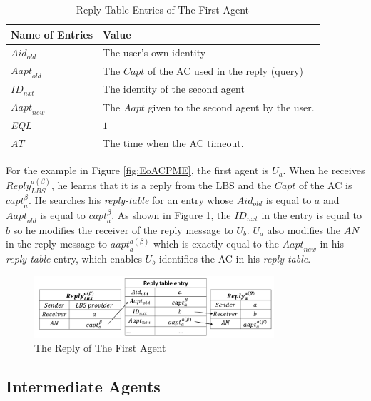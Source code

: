 \documentclass[conference]{IEEEtran}
\begin{document}
\begin{table} [hbtp]
\caption{Reply Table Entries of The First Agent}
\label{table:RTEFirstAgt}
\centering
\tabulinesep=1mm
\begin{tabu} to 80 mm {|X[1,c]|X[3,l]|} \hline 
Name of Entries & Value \\ \hline 
${Aid}_{old}$ & The user's own identity \\ \hline 
${Aapt}_{old}$ & The $Capt$ of the AC used in the reply (query) \\ \hline 
${ID}_{nxt}$ & The identity of the second agent \\ \hline 
${Aapt}_{new}$ & The $Aapt$ given to the second agent by the user. \\ \hline 
\textit{EQL} & $1$ \\ \hline 
$AT$ & The time when the AC timeout. \\ \hline 
\end{tabu}
\end{table}

For the example in Figure \ref{fig:EoACPME}, the first agent is $U_a$. When he receives ${Reply}^{a\left(\beta\right)}_{LBS}$, he learns that it is a reply from the LBS and the $Capt$ of the AC is ${capt}^{\beta}_a$. He searches his \textit{reply-table} for an entry whose ${Aid}_{old}$ is equal to $a$ and ${Aapt}_{old}$ is equal to ${capt}^{\beta }_a$. As shown in Figure \ref{fig:ReplyOfFirstAgent}, the ${ID}_{nxt}$ in the entry is equal to $b$ so he modifies the receiver of the reply message to $U_b$. $U_a$ also modifies the $AN$ in the reply message to ${aapt}^{a\left(\beta\right)}_a$ which is exactly equal to the ${Aapt}_{new}$ in his \textit{reply-table} entry, which enables $U_b$ identifies the AC in his \textit{reply-table}. 

\begin{figure} [H]
  \centering 
  \includegraphics[width=3.5in]{figures/FIG_4_7_The_Reply_of_The_First_Agent.png}
  \caption{The Reply of The First Agent} 
  \label{fig:ReplyOfFirstAgent} %
\end{figure}

\subsection{ Intermediate Agents}
\end{document}
